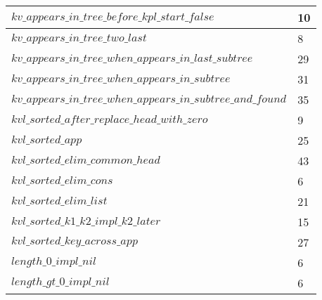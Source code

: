 \begin{tabular}{| l | l |}
$kv\_appears\_in\_tree\_before\_kpl\_start\_false$ & 10 \\ \hline
$kv\_appears\_in\_tree\_two\_last$ & 8 \\ \hline
$kv\_appears\_in\_tree\_when\_appears\_in\_last\_subtree$ & 29 \\ \hline
$kv\_appears\_in\_tree\_when\_appears\_in\_subtree$ & 31 \\ \hline
$kv\_appears\_in\_tree\_when\_appears\_in\_subtree\_and\_found$ & 35 \\ \hline
$kvl\_sorted\_after\_replace\_head\_with\_zero$ & 9 \\ \hline
$kvl\_sorted\_app$ & 25 \\ \hline
$kvl\_sorted\_elim\_common\_head$ & 43 \\ \hline
$kvl\_sorted\_elim\_cons$ & 6 \\ \hline
$kvl\_sorted\_elim\_list$ & 21 \\ \hline
$kvl\_sorted\_k1\_k2\_impl\_k2\_later$ & 15 \\ \hline
$kvl\_sorted\_key\_across\_app$ & 27 \\ \hline
$length\_0\_impl\_nil$ & 6 \\ \hline
$length\_gt\_0\_impl\_nil$ & 6 \\ \hline
\end{tabular}
\newpage
